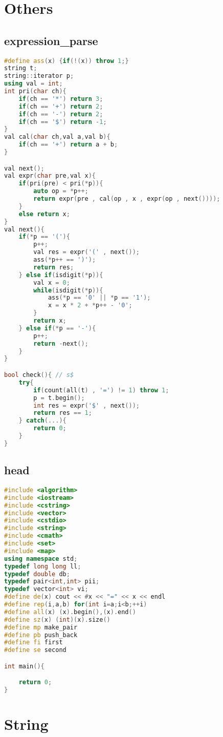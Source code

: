 \section{Others}
\subsection{expression\_parse}
\begin{lstlisting}[language=C++]
#define ass(x) {if(!(x)) throw 1;}
string t;
string::iterator p;
using val = int;
int pri(char ch){
    if(ch == '*') return 3;
    if(ch == '+') return 2;
    if(ch == '-') return 2;
    if(ch == '$') return -1;
}
val cal(char ch,val a,val b){
    if(ch == '+') return a + b;
}

val next();
val expr(char pre,val x){
    if(pri(pre) < pri(*p)){
        auto op = *p++;
        return expr(pre , cal(op , x , expr(op , next())));
    }
    else return x;
}
val next(){
    if(*p == '('){
        p++;
        val res = expr('(' , next());
        ass(*p++ == ')');
        return res;
    } else if(isdigit(*p)){
        val x = 0;
        while(isdigit(*p)){
            ass(*p == '0' || *p == '1');
            x = x * 2 + *p++ - '0';
        }
        return x;
    } else if(*p == '-'){
        p++;
        return -next();
    }
}

bool check(){ // s$
    try{
        if(count(all(t) , '=') != 1) throw 1;
        p = t.begin();
        int res = expr('$' , next());
        return res == 1;
    } catch(...){
        return 0;
    }
}
\end{lstlisting}
\subsection{head}
\begin{lstlisting}[language=C++]
#include <algorithm>
#include <iostream>
#include <cstring>
#include <vector>
#include <cstdio>
#include <string>
#include <cmath>
#include <set>
#include <map>
using namespace std;
typedef long long ll;
typedef double db;
typedef pair<int,int> pii;
typedef vector<int> vi;
#define de(x) cout << #x << "=" << x << endl
#define rep(i,a,b) for(int i=a;i<b;++i)
#define all(x) (x).begin(),(x).end()
#define sz(x) (int)(x).size()
#define mp make_pair
#define pb push_back
#define fi first
#define se second

int main(){

    return 0;
}
\end{lstlisting}

\section{String}
